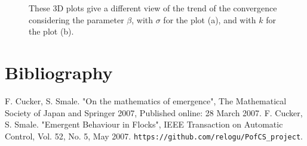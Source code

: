 \documentclass{article} %
\newcounter{math}
\begin{document}
\begin{figure}[ht]
    \centering
    \caption{These 3D plots give a different view of the trend of the convergence 
        considering the parameter $\beta$, with $\sigma$ for the plot (a), and with 
        $k$ for the plot (b).}
    \label{fig3}
\end{figure}
\newpage
\section{Bibliography}
\begin{thebibliography}{90}
F. Cucker, S. Smale. "On the mathematics of emergence", The Mathematical Society of Japan and Springer 2007, Published online: 28 March 2007.
F. Cucker, S. Smale. "Emergent Behaviour in Flocks", IEEE Transaction on Automatic Control, Vol. 52, No. 5, May 2007.
\verb|https://github.com/relogu/PofCS_project|.
\end{thebibliography}

\newpage
\appendix
\renewcommand\thefigure{\thesection.\arabic{figure}}
\end{document}
